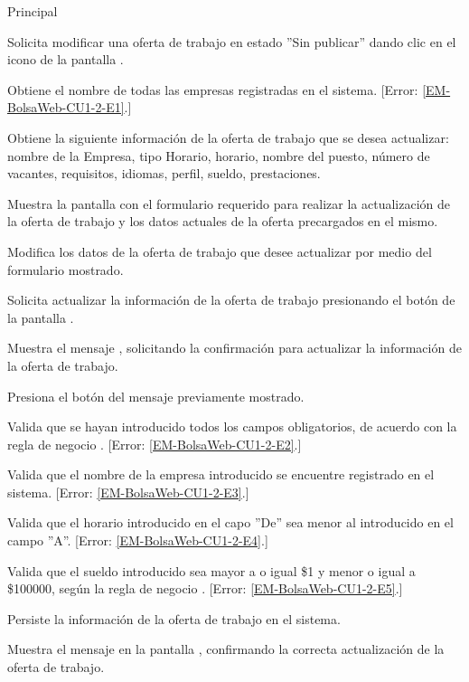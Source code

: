 	\begin{UCtrayectoria}{Principal}

		\UCpaso[\UCactor] Solicita modificar una oferta de trabajo en estado ''Sin publicar'' dando clic en el icono  de la pantalla .

		\UCpaso Obtiene el nombre de todas las empresas registradas en el sistema. [Error: \ref{EM-BolsaWeb-CU1-2-E1}.]

		\UCpaso Obtiene la siguiente información de la oferta de trabajo que se desea actualizar: nombre de la Empresa, tipo Horario, horario, nombre del puesto, número de vacantes, requisitos, idiomas, perfil, sueldo, prestaciones.

		\UCpaso Muestra la pantalla  con el formulario requerido para realizar la actualización de la oferta de trabajo y los datos actuales de la oferta precargados en el mismo.

		\UCpaso [\UCactor] Modifica los datos de la oferta de trabajo que desee actualizar por medio del formulario mostrado. \label{l_EM_BolsaWeb_CU1_2_InicioFormulario}

		\UCpaso [\UCactor] Solicita actualizar la información de la oferta de trabajo presionando el botón  de la pantalla .  

		\UCpaso Muestra el mensaje , solicitando la confirmación para actualizar la información de la oferta de trabajo.

		\UCpaso [\UCactor] Presiona el botón  del mensaje previamente mostrado.

		\UCpaso Valida que se hayan introducido todos los campos obligatorios, de acuerdo con la regla de negocio . [Error: \ref{EM-BolsaWeb-CU1-2-E2}.]

		\UCpaso Valida que el nombre de la empresa introducido se encuentre registrado en el sistema. [Error: \ref{EM-BolsaWeb-CU1-2-E3}.]

		\UCpaso Valida que el horario introducido en el capo ''De'' sea menor al introducido en el campo ''A''. [Error: \ref{EM-BolsaWeb-CU1-2-E4}.]

		\UCpaso Valida que el sueldo introducido sea mayor a o igual \$1 y menor o igual a \$100000, según la regla de negocio . [Error: \ref{EM-BolsaWeb-CU1-2-E5}.]

		\UCpaso Persiste la información de la oferta de trabajo en el sistema. 

		\UCpaso Muestra el mensaje  en la pantalla , confirmando la correcta actualización de la oferta de trabajo.		
	
	\end{UCtrayectoria}

